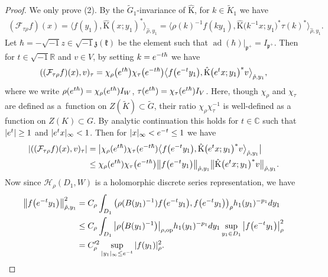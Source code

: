 \documentclass[11pt]{article}
\numberwithin{equation}{section}
\newcommand{\BR}{\mathbb{R}}
\newcommand{\BC}{\mathbb{C}}
\newcommand{\fk}{\mathfrak{k}}
\newcommand{\fp}{\mathfrak{p}}
\newcommand{\fz}{\mathfrak{z}}
\newcommand{\cF}{\mathcal{F}}
\newcommand{\cH}{\mathcal{H}}
\newcommand{\rK}{\mathrm{K}}
\begin{document}
\begin{proof}
We only prove (2). By the $\tilde{G}_1$-invariance of $\hat{\rK}$, for $k\in \tilde{K}_1$ we have
\begin{gather*} (\cF_{\tau\rho}f)(x)=\big\langle f(y_1),\hat{\rK}(x;y_1)^*\big\rangle_{\hat{\rho},y_1}
=\big\langle \rho(k)^{-1}f(ky_1),\hat{\rK}\big(k^{-1}x;y_1\big)^*\tau(k)^*\big\rangle_{\hat{\rho},y_1}. \end{gather*}
Let $\hbar=-\sqrt{-1}z\in\sqrt{-1}\fz(\fk)$ be the element such that $\operatorname{ad}(\hbar)|_{\fp^+}=I_{\fp^+}$.
Then for $t\in\sqrt{-1}\BR$ and $v\in V$, by setting $k={\rm e}^{-t\hbar}$ we have
\begin{gather*} ((\cF_{\tau\rho}f)(x),v)_\tau=\chi_\rho\big({\rm e}^{t\hbar}\big)\chi_\tau\big({\rm e}^{-t\hbar}\big)\big\langle f\big({\rm e}^{-t}y_1\big),
\hat{\rK}\big({\rm e}^tx;y_1\big)^*v\big\rangle_{\hat{\rho},y_1}, \end{gather*}
where we write $\rho({\rm e}^{t\hbar})=\chi_\rho({\rm e}^{t\hbar})I_W$, $\tau({\rm e}^{t\hbar})=\chi_\tau({\rm e}^{t\hbar})I_V$.
Here, though $\chi_\rho$ and $\chi_\tau$ are defined as a~function on $Z(\tilde{K})\subset \tilde{G}$,
their ratio $\chi_\rho\chi_\tau^{-1}$ is well-defined as a function on $Z(K)\subset G$.
By analytic continuation this holds for $t\in\BC$ such that $|{\rm e}^t|\ge 1$ and $|{\rm e}^t x|_\infty <1$.
Then for $|x|_\infty<{\rm e}^{-t}\le 1$ we have
\begin{align*}
|((\cF_{\tau\rho}f)(x),v)_\tau|&=\big|\chi_\rho({\rm e}^{t\hbar})\chi_\tau({\rm e}^{-t\hbar})\big\langle f\big({\rm e}^{-t}y_1\big),
\hat{\rK}\big({\rm e}^tx;y_1\big)^*v\big\rangle_{\hat{\rho},y_1}\big| \\
&\le \chi_\rho({\rm e}^{t\hbar})\chi_\tau\big({\rm e}^{-t\hbar}\big)\big\Vert f\big({\rm e}^{-t}y_1\big)\big\Vert_{\hat{\rho},y_1}
\big\Vert\hat{\rK}\big({\rm e}^tx;y_1\big)^*v\big\Vert_{\hat{\rho},y_1}.
\end{align*}
Now since $\cH_\rho(D_1,W)$ is a holomorphic discrete series representation, we have
\begin{align*}
\big\Vert f\big({\rm e}^{-t}y_1\big)\big\Vert_{\hat{\rho},y_1}^2
&=C_\rho\int_{D_1}\big(\rho(B(y_1)^{-1})f\big({\rm e}^{-t}y_1\big),f\big({\rm e}^{-t}y_1\big)\big)_\rho h_1(y_1)^{-p_1}{\rm d}y_1 \\
&\le C_\rho\int_{D_1}\big|\rho\big(B(y_1)^{-1}\big)\big|_{\rho,\mathrm{op}}h_1(y_1)^{-p_1}{\rm d}y_1 \sup_{y_1\in D_1}\big|f\big({\rm e}^{-t}y_1\big)\big|_\rho^2 \\
&=C_\rho^{\prime 2}\sup_{|y_1|_\infty\le {\rm e}^{-t}} |f(y_1)|_\rho^2.

\end{align*}
\end{proof}
\end{document}
